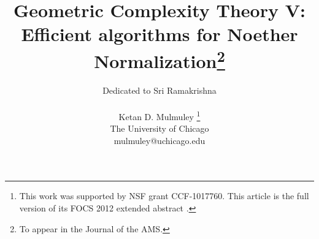 \documentclass[11pt]{article}
\begin{document}
\title{Geometric Complexity Theory V: Efficient algorithms for Noether Normalization\footnote{To appear in the Journal of the AMS.}}
\author{Dedicated to Sri Ramakrishna \\ \\
Ketan D. Mulmuley \footnote{This work was supported by NSF grant CCF-1017760. This article is the full version of its FOCS 2012 extended abstract \cite{GCT5focs}.}
 \\
The University of Chicago \\ mulmuley@uchicago.edu}


\maketitle

\newtheorem{prop}{Proposition}[section]
\newtheorem{claim}[prop]{Claim}
\newtheorem{goal}[prop]{Goal}
\newtheorem{theorem}[prop]{Theorem}
\newtheorem{hypo}[prop]{Hypothesis}
\newtheorem{guess}[prop]{Guess}
\newtheorem{problem}[prop]{Problem}
\newtheorem{axiom}[prop]{Axiom}
\newtheorem{question}[prop]{Question}
\newtheorem{remark}[prop]{Remark}
\newtheorem{lemma}[prop]{Lemma}
\newtheorem{claimedlemma}[prop]{Claimed Lemma}
\newtheorem{claimedtheorem}[prop]{Claimed Theorem}
\newtheorem{cor}[prop]{Corollary}
\newtheorem{defn}[prop]{Definition}
\newtheorem{ex}[prop]{Example}
\newtheorem{conj}[prop]{Conjecture}
\newtheorem{obs}[prop]{Observation}
\newtheorem{phyp}[prop]{Positivity Hypothesis}
\newcommand{\bitlength}[1]{\langle #1 \rangle}
\newcommand{\ca}[1]{{\cal #1}}
\newcommand{\floor}[1]{{\lfloor #1 \rfloor}}
\newcommand{\ceil}[1]{{\lceil #1 \rceil}}
\newcommand{\gt}[1]{{\langle  #1 |}}
\newcommand{\C}{\mathbb{C}}
\newcommand{\F}{\mathbb{F}}
\newcommand{\N}{\mathbb{N}}
\newcommand{\R}{\mathbb{R}}
\newcommand{\Z}{\mathbb{Z}}
\newcommand{\frcgc}[5]{\left(\begin{array}{ll} #1 &  \\ #2 & | #4 \\ #3 & | #5
\end{array}\right)}


\newcommand{\cgc}[6]{\left(\begin{array}{ll} #1 ;& \quad #3\\ #2 ; & \quad #4
\end{array}\right| \left. \begin{array}{l} #5 \\ #6 \end{array} \right)}
\end{document}
